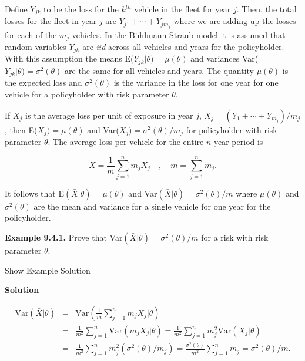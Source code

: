 \documentclass[]{book}
\theoremstyle{definition}
\theoremstyle{definition}
\theoremstyle{definition}
\theoremstyle{remark}
\begin{document}
Define \(Y_{jk}\) to be the loss for the \(k^{th}\) vehicle in the fleet
for year \(j\). Then, the total losses for the fleet in year \(j\) are
\(Y_{j1}+\cdots+Y_{jm_j}\) where we are adding up the losses for each of
the \(m_j\) vehicles. In the Bühlmann-Straub model it is assumed that
random variables \(Y_{jk}\) are \emph{iid} across all vehicles and years
for the policyholder. With this assumption the means
E(\(Y_{jk}|\theta)=\mu(\theta)\) and variances
Var(\(Y_{jk}|\theta)=\sigma^2(\theta)\) are the same for all vehicles
and years. The quantity \(\mu(\theta)\) is the expected loss and
\(\sigma^2(\theta)\) is the variance in the loss for one year for one
vehicle for a policyholder with risk parameter \(\theta\).

If \(X_j\) is the average loss per unit of exposure in year \(j\),
\(X_j=(Y_1+\cdots+Y_{m_j})/m_j\), then E(\(X_j)=\mu(\theta)\) and
Var(\(X_j)=\sigma^2(\theta)/m_j\) for policyholder with risk parameter
\(\theta\). The average loss per vehicle for the entire \(n\)-year
period is

\begin{equation*}
\bar{X}= \frac{1}{m} \sum_{j=1}^{n} m_j X_{j} \quad , \quad  m=\sum_{j=1}^{n}  m_j. 
\end{equation*}

It follows that E\((\bar{X}|\theta)=\mu(\theta)\) and
Var\((\bar{X}|\theta)=\sigma^2(\theta)/m\) where \(\mu(\theta)\) and
\(\sigma^2(\theta)\) are the mean and variance for a single vehicle for
one year for the policyholder.

\textbf{Example 9.4.1.} Prove that
Var\((\bar{X}|\theta)=\sigma^2(\theta)/m\) for a risk with risk
parameter \(\theta\).

Show Example Solution

\hypertarget{toggleExampleCred.4.1}{}
\textbf{Solution}

\begin{eqnarray*}
\mathrm{Var}(\bar{X}|\theta)&=&\mathrm{Var}\left(\frac{1}{m} \sum_{j=1}^{n} m_j X_j|\theta \right)\\
                                  &=&\frac{1}{m^2}\sum_{j=1}^{n} \mathrm{Var}(m_j X_{j}|\theta)=\frac{1}{m^2}\sum_{j=1}^{n} m_j^2 \mathrm{Var}(X_j|\theta)\\
                                  &=&\frac{1}{m^2}\sum_{j=1}^{n} m_j^2 (\sigma^2(\theta)/m_j)=\frac{\sigma^2(\theta)}{m^2}\sum_{j=1}^{n} m_j=\sigma^2(\theta)/m.\\
\end{eqnarray*}
\end{document}
